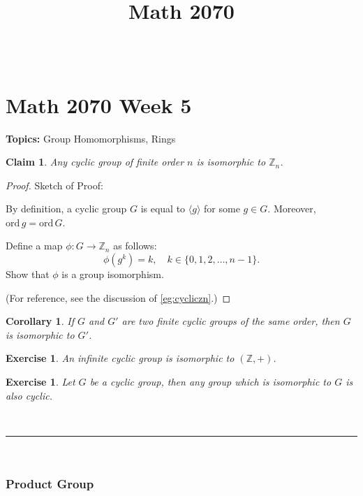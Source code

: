 \documentclass[a4paper,12pt]{report}
\newcommand{\ord}{\mathrm{ord}\,}
\renewcommand{\ord}{\mathrm{ord}\,}
\newcounter{statement}
\numberwithin{statement}{chapter}
\newtheorem{claim}[statement]{Claim}
\newtheorem{cor}[statement]{Corollary}
\newtheorem{ex}[statement]{\bf Exercise}
\numberwithin{equation}{chapter}
\numberwithin{section}{chapter}
\numberwithin{subsection}{section}
\begin{document}
$\newcommand{\ord}{\mathrm{ord}\,}$
\title{Math 2070}
\setcounter{chapter}{5}\setcounter{section}{0}
\setcounter{subsection}{0}
\setcounter{statement}{0}

\chapter*{Math 2070 Week 5}
{\bf Topics: }Group Homomorphisms, Rings




\begin{claim}
Any cyclic group of finite order $n$ is isomorphic to $\mathbb{Z}_n$.
\end{claim}
\begin{proof}

Sketch of Proof:



By definition, a cyclic group $G$ is equal to $\langle g\rangle$ for some $g \in G$.
Moreover, $\ord g = \ord G$.



Define a map $\phi : G \longrightarrow \mathbb{Z}_n$ as follows:
\[
\phi(g^k) = k, \quad k \in \{0, 1, 2, \ldots, n - 1\}.
\]
Show that $\phi$ is a group isomorphism.



(For reference, see the discussion of \cref{eg:cycliczn}.)
\end{proof}



\begin{cor}

If $G$ and $G'$ are two finite cyclic groups of the same order, then $G$ is isomorphic to $G'$.

\end{cor}



\begin{ex}

An infinite cyclic group is isomorphic to $(\mathbb{Z}, +)$.
\end{ex}



\begin{ex}

Let $G$ be a cyclic group, then any group which is isomorphic to $G$ is also cyclic.
\end{ex}




\quad\\\hrule
\quad\\
\subsection*{Product Group}
\end{document}
